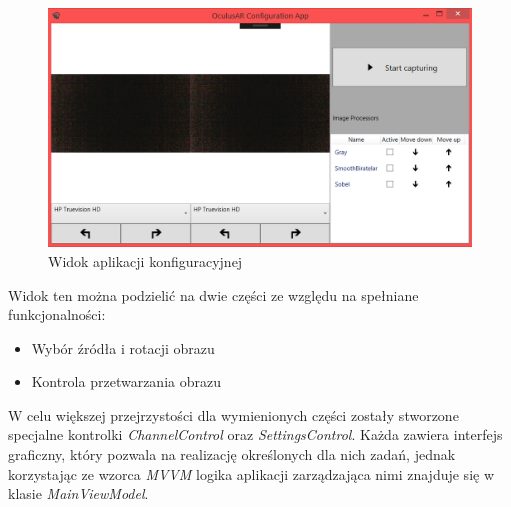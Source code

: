 \documentclass[a4paper,11pt,twoside]{report}
\theoremstyle{definition}
\begin{document}
\begin{figure}[h]
\centering
\includegraphics[scale=0.4]{images/mainwindow_screen}
\caption[Widok aplikacji]{Widok aplikacji konfiguracyjnej}
\end{figure}

\pagebreak
Widok ten można podzielić na dwie części ze względu na spełniane funkcjonalności:

\begin{itemize}
\item Wybór źródła i rotacji obrazu
\item Kontrola przetwarzania obrazu
\end{itemize}

W celu większej przejrzystości dla wymienionych części zostały stworzone specjalne kontrolki \textit{ChannelControl} oraz \textit{SettingsControl}. Każda zawiera interfejs graficzny, który pozwala na realizację określonych dla nich zadań, jednak korzystając ze wzorca \textit{MVVM} logika aplikacji zarządzająca nimi znajduje się w klasie \textit{MainViewModel}. 
\end{document}

